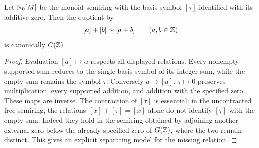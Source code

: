 \begin{proposition}\label{prop:preaddition-rebuild}
Let $\mathbb N_0[M]$ be the monoid semiring with the basis symbol $[\tau]$ identified with its additive zero. Then the quotient by
\[
 [a]+[b]\sim[a+b]\qquad(a,b\in\mathbb Z)
\]
is canonically $G(\mathbb Z)$.
\end{proposition}
\begin{proof}
Evaluation $[a]\mapsto a$ respects all displayed relations. Every nonempty supported sum reduces to the single basis symbol of its integer sum, while the empty sum remains the symbol $\tau$. Conversely $a\mapsto[a]$, $\tau\mapsto0$ preserves multiplication, every supported addition, and addition with the specified zero. These maps are inverse. The contraction of $[\tau]$ is essential: in the uncontracted free semiring, the relations $[x]+[\tau]=[x]$ alone do not identify $[\tau]$ with the empty sum. Indeed they hold in the semiring obtained by adjoining another external zero below the already specified zero of $G(\mathbb Z)$, where the two remain distinct. This gives an explicit separating model for the missing relation.
\end{proof}

